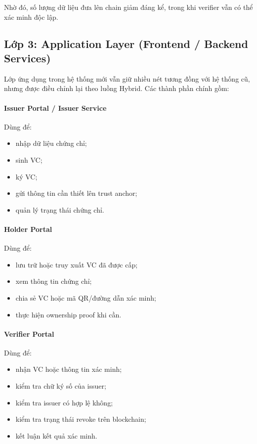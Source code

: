 Nhờ đó, số lượng dữ liệu đưa lên chain giảm đáng kể, trong khi verifier vẫn có thể xác minh độc lập.

\subsection{Lớp 3: Application Layer (Frontend / Backend Services)}
Lớp ứng dụng trong hệ thống mới vẫn giữ nhiều nét tương đồng với hệ thống cũ, nhưng được điều chỉnh lại theo luồng Hybrid. Các thành phần chính gồm:

\paragraph{Issuer Portal / Issuer Service}
Dùng để:
\begin{itemize}
    \item nhập dữ liệu chứng chỉ;
    \item sinh VC;
    \item ký VC;
    \item gửi thông tin cần thiết lên trust anchor;
    \item quản lý trạng thái chứng chỉ.
\end{itemize}

\paragraph{Holder Portal}
Dùng để:
\begin{itemize}
    \item lưu trữ hoặc truy xuất VC đã được cấp;
    \item xem thông tin chứng chỉ;
    \item chia sẻ VC hoặc mã QR/đường dẫn xác minh;
    \item thực hiện ownership proof khi cần.
\end{itemize}

\paragraph{Verifier Portal}
Dùng để:
\begin{itemize}
    \item nhận VC hoặc thông tin xác minh;
    \item kiểm tra chữ ký số của issuer;
    \item kiểm tra issuer có hợp lệ không;
    \item kiểm tra trạng thái revoke trên blockchain;
    \item kết luận kết quả xác minh.
\end{itemize}

